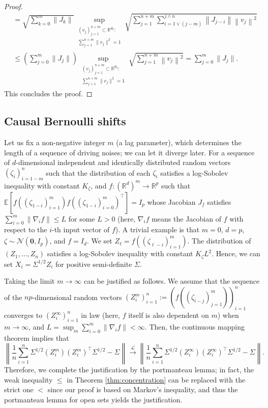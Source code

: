 \documentclass[11pt,a4paper]{article}
\theoremstyle{remark}
\theoremstyle{definition}
\newcommand{\bX}{X}
\newcommand{\bZ}{Z}
\newcommand{\bsf}{f}
\newcommand{\bv}{v}
\newcommand{\bzeta}{\zeta}
\newcommand{\bfI}{I}
\newcommand{\bfJ}{J}
\newcommand{\bfZ}{Z}
\newcommand{\bSigma}{\Sigma}
\newcommand{\calL}{\mathcal{L}}
\newcommand{\R}{\mathbb{R}}
\newcommand{\E}{\mathbb{E}}
\newcommand{\Gauss}{\mathcal{N}}
\newcommand{\zero}{\mathbf{0}}
\theoremstyle{definition}
\begin{document}
\begin{bibunit}[apalike]
\begin{proof}
\begin{align*}
        &=\sqrt{\sum_{k=0}^{m}\|\bfJ_{k}\|}\sup_{\substack{(\bv_{j})_{j=1}^{n+m}\subset\R^{d_{2}}:\\
        \sum_{j=1}^{n+m}\|\bv_{j}\|^{2}=1}}
        \sqrt{\sum_{j=1}^{n+m}\sum_{i=1\vee (j-m)}^{j\wedge n}\left\|\bfJ_{j-i}\right\|\left\|\bv_{j}\right\|^{2}}\\
        &\le \left(\sum_{j=0}^{m}\|\bfJ_{j}\|\right)\sup_{\substack{(\bv_{j})_{j=1}^{n+m}\subset\R^{d_{2}}:\\
        \sum_{j=1}^{n+m}\|\bv_{j}\|^{2}=1}}
        \sqrt{\sum_{j=1}^{n+m}\left\|\bv_{j}\right\|^{2}}=\sum_{j=0}^{m}\|\bfJ_{j}\|.
    \end{align*}
    This concludes the proof.
\end{proof}


\subsection{Causal Bernoulli shifts}\label{corr:sec:example:cbs}
Let us fix a non-negative integer $m$ (a lag parameter), which determines the length of a sequence of driving noises; we can let it diverge later.
For a sequence of $d$-dimensional independent and identically distributed random vectors $(\bzeta_{i})_{i=1-m}^{n}$ such that the distribution of each $\bzeta_{i}$ satisfies a log-Sobolev inequality with constant $K_{\bzeta}$, and $\bsf:(\R^{d})^{m}\to\R^{p}$ such that $\E[\bsf((\bzeta_{1-i})_{i=1}^{m})\bsf((\bzeta_{1-i})_{i=0}^{m})^{\top}]=\bfI_{p}$ whose Jacobian $\bfJ_{\bsf}$ satisfies $\sum_{i=0}^{m}\left\|\nabla_{i}\bsf\right\|\le L$ for some $L>0$ (here, $\nabla_{i}\bsf$ means the Jacobian of $\bsf$ with respect to the $i$-th input vector of $\bsf$).
A trivial example is that $m=0$, $d=p$, $\bzeta\sim\Gauss(\zero,\bfI_{p})$, and $\bsf=\bfI_{d}$.
We set $\bfZ_{\ell}=\bsf((\bzeta_{\ell-i})_{i=1}^{m})$.
The distribution of $(\bfZ_{1},\ldots,\bfZ_{n})$ satisfies a log-Sobolev inequality with constant $K_{\bzeta}L^{2}$.
Hence, we can set $\bX_{i}=\bSigma^{1/2}\bZ_{i}$ for positive semi-definite $\bSigma$.

Taking the limit $m\to\infty$ can be justified as follows. We assume that the sequence of the $np$-dimensional random vectors $(\bZ_{i}^{m})_{i=1}^{n}:=(\bsf((\bzeta_{i-j})_{j=1}^{m}))_{i=1}^{n}$ converges to $(\bZ_{i}^{\infty})_{i=1}^{n}$ in law (here, $\bsf$ itself is also dependent on $m$) when $m\to\infty$, and $L=\sup_{m}\sum_{i=0}^{m}\|\nabla_{i}\bsf\|<\infty$.
Then, the continuous mapping theorem implies that 
\begin{equation*}
    \left\|\frac{1}{n}\sum_{i=1}^{n}\bSigma^{1/2}(\bZ_{i}^{m})(\bZ_{i}^{m})^{\top}\bSigma^{1/2}-\bSigma\right\|\overset{\calL}{\to}\left\|\frac{1}{n}\sum_{i=1}^{n}\bSigma^{1/2}(\bZ_{i}^{\infty})(\bZ_{i}^{\infty})^{\top}\bSigma^{1/2}-\bSigma\right\|.
\end{equation*}
Therefore, we complete the justification by the portmanteau lemma; in fact, the weak inequality $\le$ in Theorem \ref{thm:concentration} can be replaced with the strict one $<$ since our proof is based on Markov's inequality, and thus the portmanteau lemma for open sets yields the justification.


\end{bibunit}
\end{document}
